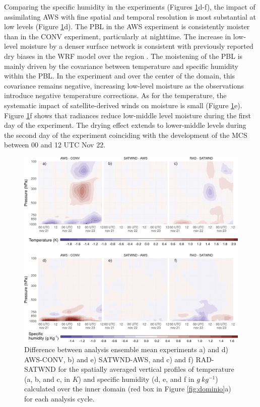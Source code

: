 \documentclass[preprint, 3p, authoryear,review, 12pt]{elsarticle} %
\begin{document}
Comparing the specific humidity in the experiments (Figures \ref{fig:TQ-diff}d-f), the impact of assimilating AWS with fine spatial and temporal resolution is most substantial at low levels (Figure \ref{fig:TQ-diff}d). The PBL in the AWS experiment is consistently moister than in the CONV experiment, particularly at nighttime. The increase in low-level moisture by a denser surface network is consistent with previously reported dry biases in the WRF model over the region \citep[\citet{matsudo2021}, \citet{ruiz2010}]{casaretto2022}. The moistening of the PBL is mainly driven by the covariance between temperature and specific humidity within the PBL. In the experiment and over the center of the domain, this covariance remains negative, increasing low-level moisture as the observations introduce negative temperature corrections. As for the temperature, the systematic impact of satellite-derived winds on moisture is small (Figure \ref{fig:TQ-diff}e). Figure \ref{fig:TQ-diff}f shows that radiances reduce low-middle level moisture during the first day of the experiment. The drying effect extends to lower-middle levels during the second day of the experiment coinciding with the development of the MCS between 00 and 12 UTC Nov 22.



\begin{figure}[ht]

{\centering \includegraphics{../figures/TQ-diff-1} 

}

\caption{Difference between analysis ensemble mean experiments a) and d) AWS-CONV, b) and e) SATWND-AWS, and c) and f) RAD-SATWND for the spatially averaged vertical profiles of temperature (a, b, and c, in \(K\)) and specific humidity (d, e, and f in \(g\ kg^{-1}\)) calculated over the inner domain (red box in Figure \ref{fig:dominio}a) for each analysis cycle.}\label{fig:TQ-diff}
\end{figure}
\end{document}
